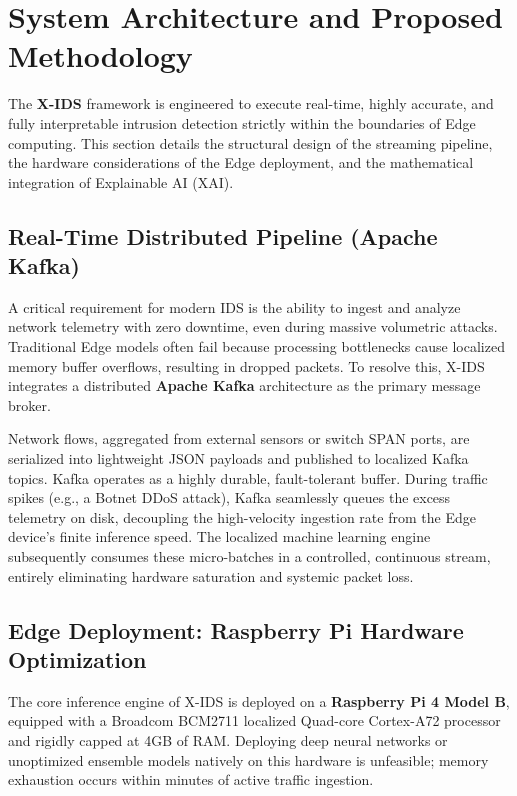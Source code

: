 \section{System Architecture and Proposed Methodology}
The \textbf{X-IDS} framework is engineered to execute real-time, highly accurate, and fully interpretable intrusion detection strictly within the boundaries of Edge computing. This section details the structural design of the streaming pipeline, the hardware considerations of the Edge deployment, and the mathematical integration of Explainable AI (XAI).

\subsection{Real-Time Distributed Pipeline (Apache Kafka)}
A critical requirement for modern IDS is the ability to ingest and analyze network telemetry with zero downtime, even during massive volumetric attacks. Traditional Edge models often fail because processing bottlenecks cause localized memory buffer overflows, resulting in dropped packets. To resolve this, X-IDS integrates a distributed \textbf{Apache Kafka} architecture as the primary message broker.

Network flows, aggregated from external sensors or switch SPAN ports, are serialized into lightweight JSON payloads and published to localized Kafka topics. Kafka operates as a highly durable, fault-tolerant buffer. During traffic spikes (e.g., a Botnet DDoS attack), Kafka seamlessly queues the excess telemetry on disk, decoupling the high-velocity ingestion rate from the Edge device's finite inference speed. The localized machine learning engine subsequently consumes these micro-batches in a controlled, continuous stream, entirely eliminating hardware saturation and systemic packet loss.

\subsection{Edge Deployment: Raspberry Pi Hardware Optimization}
The core inference engine of X-IDS is deployed on a \textbf{Raspberry Pi 4 Model B}, equipped with a Broadcom BCM2711 localized Quad-core Cortex-A72 processor and rigidly capped at 4GB of RAM. Deploying deep neural networks or unoptimized ensemble models natively on this hardware is unfeasible; memory exhaustion occurs within minutes of active traffic ingestion.

